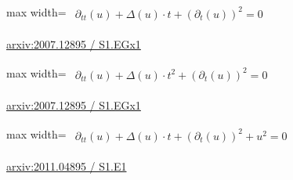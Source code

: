 \documentclass[10pt,a4paper]{article}
\begin{document}
\begin{minipage}{\linewidth}
\begin{center}\begin{adjustbox}{max width=\linewidth}$\displaystyle\begin{gathered}\begin{gathered}\partial_{tt}(u)+\Delta(u)\cdot t+(\partial_{t}(u))^{2}=0\end{gathered}\end{gathered}$\end{adjustbox}\end{center}
{\small \href{https://arxiv.org/html/2007.12895#S1.EGx1}{arxiv:2007.12895 / S1.EGx1}}\par
\end{minipage}\par\vspace{7mm}

\begin{minipage}{\linewidth}
\begin{center}\begin{adjustbox}{max width=\linewidth}$\displaystyle\begin{gathered}\begin{gathered}\partial_{tt}(u)+\Delta(u)\cdot t^{2}+(\partial_{t}(u))^{2}=0\end{gathered}\end{gathered}$\end{adjustbox}\end{center}
{\small \href{https://arxiv.org/html/2007.12895#S1.EGx1}{arxiv:2007.12895 / S1.EGx1}}\par
\end{minipage}\par\vspace{7mm}

\begin{minipage}{\linewidth}
\begin{center}\begin{adjustbox}{max width=\linewidth}$\displaystyle\begin{gathered}\begin{gathered}\partial_{tt}(u)+\Delta(u)\cdot t+(\partial_{t}(u))^{2}+u^{2}=0\end{gathered}\end{gathered}$\end{adjustbox}\end{center}
{\small \href{https://arxiv.org/html/2011.04895#S1.E1}{arxiv:2011.04895 / S1.E1}}\par
\end{minipage}\par\vspace{7mm}
\end{document}
